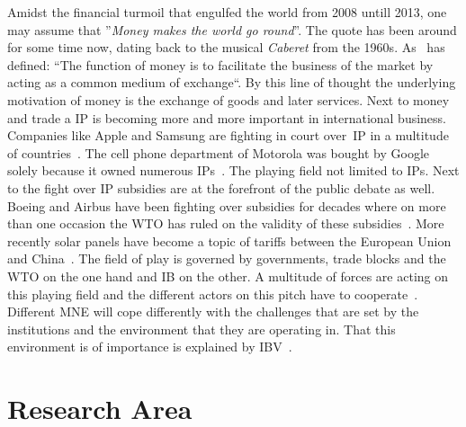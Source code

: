 Amidst the financial turmoil that engulfed the world from 2008 untill 2013, one may assume that ''\emph{Money makes the world go round}''. The quote has been around for some time now, dating back to the musical \emph{Caberet} from the 1960s.
As~\cite{Mises:2009} has defined: ``The function of money is to facilitate the business of the market by acting as a common medium of exchange``. 
By this line of thought the underlying motivation of money is the exchange of goods and later services.
Next to money and trade a \gls{IP} is becoming more and more important in international business.
Companies like Apple and Samsung are fighting in court over~\gls{IP} in a multitude of countries~\citep{The-Wallstreet-Journal:2013,CNN:2013}. 
The cell phone department of Motorola was bought by Google solely because it owned numerous \glspl{IP}~\citep{The-Wallstreet-Journal:2011}.
The playing field not limited to \glspl{IP}. 
Next to the fight over \gls{IP} subsidies are at the forefront of the public debate as well. 
Boeing and Airbus have been fighting over subsidies for decades where on more than one occasion the \gls{WTO} has ruled on the validity of these subsidies~\citep{The-Economist:2009,The-Economist:2009}. 
More recently solar panels have become a topic of tariffs between the European Union and China~\citep{European-Commission:2013}.
The field of play is governed by governments, trade blocks and the \gls{WTO} on the one hand and \gls{IB} on the other.
A multitude of forces are acting on this playing field and the different actors on this pitch have to cooperate~\citep{Meyer:2009ue}. 
Different \gls{MNE} will cope differently with the challenges that are set by the institutions and the environment that they are operating in. 
That this environment is of importance is explained by \gls{IBV}~\citep{Kostova:1999wt,Wang:2012ge}.

\section{Research Area}


